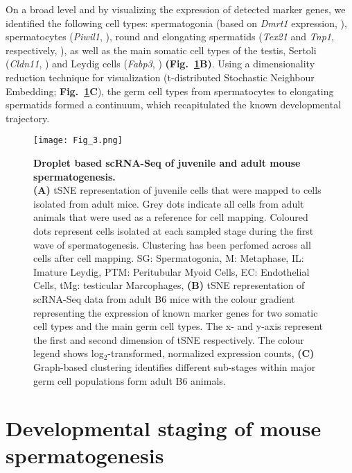 On a broad level and by visualizing the expression of detected marker genes, we identified the following cell types: spermatogonia (based on \textit{Dmrt1} expression, \citep{Matson2010}), spermatocytes (\textit{Piwil1}, \citep{Deng2002}), round and elongating spermatids (\textit{Tex21} and \textit{Tnp1}, respectively, \citep{Fujii2002}), as well as the main somatic cell types of the testis, Sertoli (\textit{Cldn11}, \citep{Mazaud-Guittot2010}) and Leydig cells (\textit{Fabp3}, \citep{Oresti2013}) \textbf{(Fig.~\ref{fig3:cell_types}B)}. Using a dimensionality reduction technique for visualization (t-distributed Stochastic Neighbour Embedding; \textbf{Fig.~\ref{fig3:cell_types}C}), the germ cell types from spermatocytes to elongating spermatids formed a continuum, which recapitulated the known developmental trajectory.

\newpage

\begin{figure}[!h]
\centering
\texttt{[image: Fig\_3.png]}
\caption[Droplet based scRNA-Seq of juvenile and adult mouse spermatogenesis]{\textbf{Droplet based scRNA-Seq of juvenile and adult mouse spermatogenesis.}\\
\textbf{(A)} tSNE representation of juvenile cells that were mapped to cells isolated from adult mice. Grey dots indicate all cells from adult animals that were used as a reference for cell mapping. Coloured dots represent cells isolated at each sampled stage during the first wave of spermatogenesis. Clustering has been perfomed across all cells after cell mapping. SG: Spermatogonia, M: Metaphase, IL: Imature Leydig, PTM: Peritubular Myoid Cells, EC: Endothelial Cells, tMg: testicular Marcophages, \textbf{(B)} tSNE representation of scRNA-Seq data from adult B6 mice with the colour gradient representing the expression of known marker genes for two somatic cell types and the main germ cell types. The x- and y-axis represent the first and second dimension of tSNE respectively. The colour legend shows log$_2$-transformed, normalized expression counts, \textbf{(C)} Graph-based clustering identifies different sub-stages within major germ cell populations form adult B6 animals. 
}
\label{fig3:cell_types}
\end{figure}

\newpage

\section{Developmental staging of mouse spermatogenesis}

